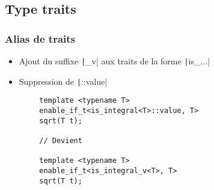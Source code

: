 \documentclass[C++.tex]{subfiles}
\begin{document}
\subsection*{Type traits}
\begin{frame}[fragile]
	\frametitle{Alias de traits}
	\begin{itemize}
		\item Ajout du suffixe \texttt|_v| aux traits de la forme \texttt|is_...|
		\item Suppression de \texttt|::value|
	\end{itemize}

	\begin{verbatim}
		template <typename T>
		enable_if_t<is_integral<T>::value, T>
		sqrt(T t);

		// Devient

		template <typename T>
		enable_if_t<is_integral_v<T>, T>
		sqrt(T t);
	\end{verbatim}


\end{frame}
\end{document}
